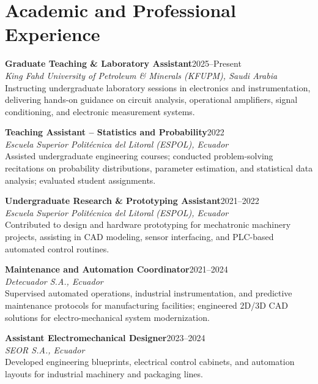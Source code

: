 \documentclass[10pt,a4paper]{article}
\newcommand{\entrytitle}[2]{%
  \textbf{#1}\hfill\textcolor{metacolor}{\small #2}%
}
\newcommand{\entryinst}[2]{%
  \textit{#1}\hfill{\small #2}%
}
\begin{document}
\vspace{6pt}
\section*{Academic and Professional Experience}

\entrytitle{Graduate Teaching \& Laboratory Assistant}{2025--Present}\\
\entryinst{King Fahd University of Petroleum \& Minerals (KFUPM), Saudi Arabia}{}\\
Instructing undergraduate laboratory sessions in electronics and instrumentation, delivering hands-on guidance on circuit analysis, operational amplifiers, signal conditioning, and electronic measurement systems.

\vspace{4pt}
\entrytitle{Teaching Assistant -- Statistics and Probability}{2022}\\
\entryinst{Escuela Superior Politécnica del Litoral (ESPOL), Ecuador}{}\\
Assisted undergraduate engineering courses; conducted problem-solving recitations on probability distributions, parameter estimation, and statistical data analysis; evaluated student assignments.

\vspace{4pt}
\entrytitle{Undergraduate Research \& Prototyping Assistant}{2021--2022}\\
\entryinst{Escuela Superior Politécnica del Litoral (ESPOL), Ecuador}{}\\
Contributed to design and hardware prototyping for mechatronic machinery projects, assisting in CAD modeling, sensor interfacing, and PLC-based automated control routines.

\vspace{4pt}
\entrytitle{Maintenance and Automation Coordinator}{2021--2024}\\
\entryinst{Detecuador S.A., Ecuador}{}\\
Supervised automated operations, industrial instrumentation, and predictive maintenance protocols for manufacturing facilities; engineered 2D/3D CAD solutions for electro-mechanical system modernization.

\vspace{4pt}
\entrytitle{Assistant Electromechanical Designer}{2023--2024}\\
\entryinst{SEOR S.A., Ecuador}{}\\
Developed engineering blueprints, electrical control cabinets, and automation layouts for industrial machinery and packaging lines.
\end{document}
